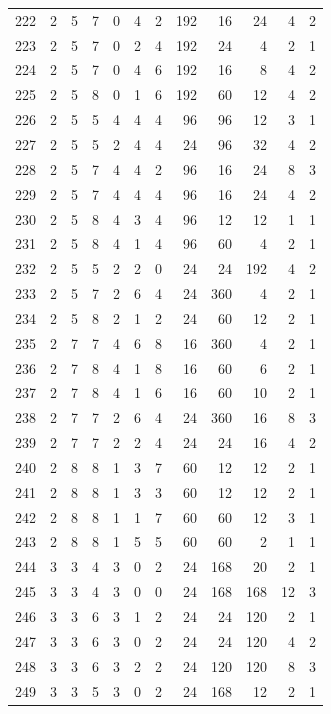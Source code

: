 \documentclass[11pt,a4paper]{article}
\begin{document}
\begin{longtable}{r|rrr|rrr|rrr|rr}
222 & 2 & 5 & 7 & 0 & 4 & 2 & 192 & 16 & 24 & 4 & 2\\
223 & 2 & 5 & 7 & 0 & 2 & 4 & 192 & 24 & 4 & 2 & 1\\
224 & 2 & 5 & 7 & 0 & 4 & 6 & 192 & 16 & 8 & 4 & 2\\
225 & 2 & 5 & 8 & 0 & 1 & 6 & 192 & 60 & 12 & 4 & 2\\
226 & 2 & 5 & 5 & 4 & 4 & 4 & 96 & 96 & 12 & 3 & 1\\
227 & 2 & 5 & 5 & 2 & 4 & 4 & 24 & 96 & 32 & 4 & 2\\
228 & 2 & 5 & 7 & 4 & 4 & 2 & 96 & 16 & 24 & 8 & 3\\
229 & 2 & 5 & 7 & 4 & 4 & 4 & 96 & 16 & 24 & 4 & 2\\
230 & 2 & 5 & 8 & 4 & 3 & 4 & 96 & 12 & 12 & 1 & 1\\
231 & 2 & 5 & 8 & 4 & 1 & 4 & 96 & 60 & 4 & 2 & 1\\
232 & 2 & 5 & 5 & 2 & 2 & 0 & 24 & 24 & 192 & 4 & 2\\
233 & 2 & 5 & 7 & 2 & 6 & 4 & 24 & 360 & 4 & 2 & 1\\
234 & 2 & 5 & 8 & 2 & 1 & 2 & 24 & 60 & 12 & 2 & 1\\
235 & 2 & 7 & 7 & 4 & 6 & 8 & 16 & 360 & 4 & 2 & 1\\
236 & 2 & 7 & 8 & 4 & 1 & 8 & 16 & 60 & 6 & 2 & 1\\
237 & 2 & 7 & 8 & 4 & 1 & 6 & 16 & 60 & 10 & 2 & 1\\
238 & 2 & 7 & 7 & 2 & 6 & 4 & 24 & 360 & 16 & 8 & 3\\
239 & 2 & 7 & 7 & 2 & 2 & 4 & 24 & 24 & 16 & 4 & 2\\
240 & 2 & 8 & 8 & 1 & 3 & 7 & 60 & 12 & 12 & 2 & 1\\
241 & 2 & 8 & 8 & 1 & 3 & 3 & 60 & 12 & 12 & 2 & 1\\
242 & 2 & 8 & 8 & 1 & 1 & 7 & 60 & 60 & 12 & 3 & 1\\
243 & 2 & 8 & 8 & 1 & 5 & 5 & 60 & 60 & 2 & 1 & 1\\
244 & 3 & 3 & 4 & 3 & 0 & 2 & 24 & 168 & 20 & 2 & 1\\
245 & 3 & 3 & 4 & 3 & 0 & 0 & 24 & 168 & 168 & 12 & 3\\
246 & 3 & 3 & 6 & 3 & 1 & 2 & 24 & 24 & 120 & 2 & 1\\
247 & 3 & 3 & 6 & 3 & 0 & 2 & 24 & 24 & 120 & 4 & 2\\
248 & 3 & 3 & 6 & 3 & 2 & 2 & 24 & 120 & 120 & 8 & 3\\
249 & 3 & 3 & 5 & 3 & 0 & 2 & 24 & 168 & 12 & 2 & 1\\

\end{longtable}
\end{document}
